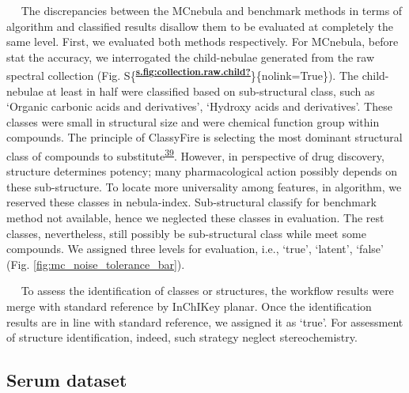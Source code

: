    The discrepancies between the MCnebula and benchmark methods in terms
of algorithm and classified results disallow them to be evaluated at
completely the same level. First, we evaluated both methods
respectively. For MCnebula, before stat the accuracy, we interrogated
the child-nebulae generated from the raw spectral collection (Fig.
S\{\textsuperscript{\protect\hyperlink{ref-s.fig:collection.raw.child}{\textbf{s.fig:collection.raw.child?}}}\}\{nolink=True\}).
The child-nebulae at least in half were classified based on
sub-structural class, such as `Organic carbonic acids and derivatives',
`Hydroxy acids and derivatives'. These classes were small in structural
size and were chemical function group within compounds. The principle of
ClassyFire is selecting the most dominant structural class of compounds
to substitute\textsuperscript{\protect\hyperlink{ref-2016}{39}}.
However, in perspective of drug discovery, structure determines potency;
many pharmacological action possibly depends on these sub-structure. To
locate more universality among features, in algorithm, we reserved these
classes in nebula-index. Sub-structural classify for benchmark method
not available, hence we neglected these classes in evaluation. The rest
classes, nevertheless, still possibly be sub-structural class while meet
some compounds. We assigned three levels for evaluation, i.e., `true',
`latent', `false' (Fig.
{\protect\NoHyper\ref{fig:mc_noise_tolerance_bar}\protect\endNoHyper}).

   To assess the identification of classes or structures, the workflow
results were merge with standard reference by InChIKey planar. Once the
identification results are in line with standard reference, we assigned
it as `true'. For assessment of structure identification, indeed, such
strategy neglect stereochemistry.

\hypertarget{serum-dataset}{%
\subsection{\texorpdfstring{\textbf{Serum
dataset}}{Serum dataset}}\label{serum-dataset}}

